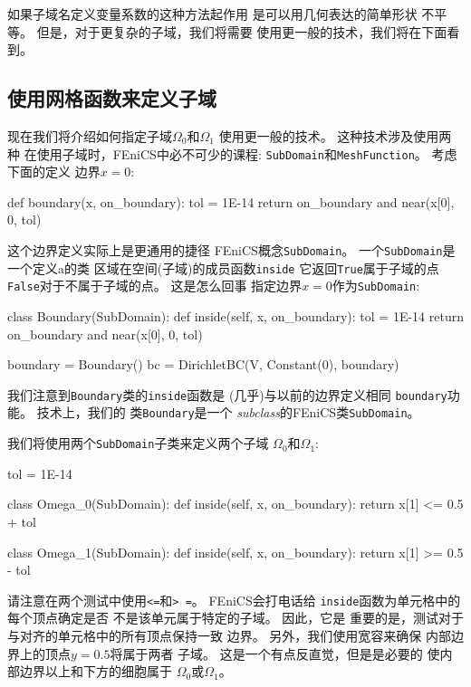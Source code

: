 如果子域名定义变量系数的这种方法起作用
是可以用几何表达的简单形状
不平等。 但是，对于更复杂的子域，我们将需要
使用更一般的技术，我们将在下面看到。


\subsection{使用网格函数来定义子域}


现在我们将介绍如何指定子域$\Omega_0$和$\Omega_1$
使用更一般的技术。 这种技术涉及使用两种
在使用子域时，FEniCS中必不可少的课程:
\texttt{SubDomain}和\texttt{MeshFunction}。 考虑下面的定义
边界$x = 0$:

\begin{python}
def boundary(x, on_boundary):
    tol = 1E-14
    return on_boundary and near(x[0], 0, tol)
\end{python}
这个边界定义实际上是更通用的捷径
FEniCS概念\texttt{SubDomain}。 一个\texttt{SubDomain}是一个定义a的类
区域在空间(子域)的成员函数\texttt{inside}
它返回\texttt{True}属于子域的点
\texttt{False}对于不属于子域的点。 这是怎么回事
指定边界$x = 0$作为\texttt{SubDomain}:

\begin{python}
class Boundary(SubDomain):
    def inside(self, x, on_boundary):
        tol = 1E-14
        return on_boundary and near(x[0], 0, tol)

boundary = Boundary()
bc = DirichletBC(V, Constant(0), boundary)
\end{python}
我们注意到\texttt{Boundary}类的\texttt{inside}函数是
(几乎)与以前的边界定义相同
\texttt{boundary}功能。 技术上，我们的
类\texttt{Boundary}是一个
\emph{subclass}的FEniCS类\texttt{SubDomain}。

我们将使用两个\texttt{SubDomain}子类来定义两个子域
$\Omega_0$和$\Omega_1$:

\begin{python}
tol = 1E-14

class Omega_0(SubDomain):
    def inside(self, x, on_boundary):
        return x[1] <= 0.5 + tol

class Omega_1(SubDomain):
    def inside(self, x, on_boundary):
        return x[1] >= 0.5 - tol
\end{python}
请注意在两个测试中使用\texttt{<=}和\texttt{> =}。 FEniCS会打电话给
\texttt{inside}函数为单元格中的每个顶点确定是否
不是该单元属于特定的子域。 因此，它是
重要的是，测试对于与对齐的单元格中的所有顶点保持一致
边界。 另外，我们使用宽容来确保
内部边界上的顶点$y = 0.5$将属于两者
子域。 这是一个有点反直觉，但是是必要的
使内部边界以上和下方的细胞属于
$\Omega_0$或$\Omega_1$。

